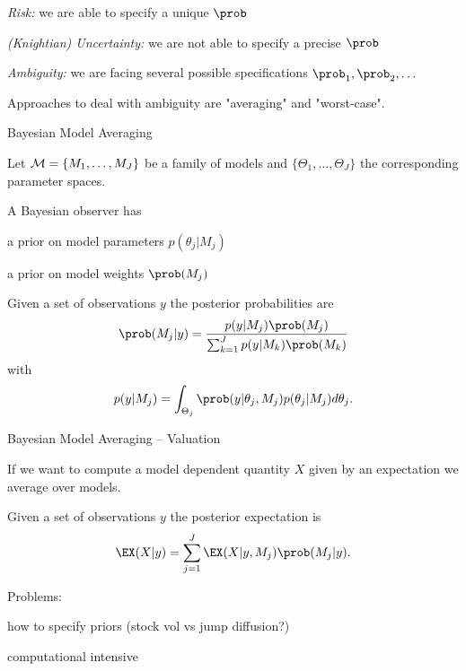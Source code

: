 



	{\it Risk:}  we are able to specify a unique $\prob$


	{\it (Knightian) Uncertainty:} we are not able to specify a precise $\prob$


	{\it Ambiguity:}  we are facing several possible specifications $\prob_1, \prob_2, \ldots$%


	Approaches to deal with ambiguity are "averaging" and "worst-case".





{Bayesian Model Averaging}






	Let ${\cal M}= \{M_1, \dots, M_J\}$ be a family of models and  $\{\Theta_1, \dots, \Theta_J\}$ the corresponding parameter spaces.


	A Bayesian observer has






	a prior on model parameters $p(\theta_j|M_j)$


	a prior on model weights $\prob(M_j)$






	Given a set of observations $y$ the posterior probabilities are
$$
\prob(M_j|y) = \frac{p(y|M_j)\prob(M_j)}{\sum_{k=1}^{J}p(y|M_k)\prob(M_k)}
$$
with
$$
p(y|M_j)=\int_{\Theta_j} \prob(y|\theta_j, M_j)p(\theta_j|M_j) d\theta_j.
$$





{Bayesian Model Averaging -- Valuation}






	If we want to compute a model dependent quantity $X$ given by an expectation we average over models.


	Given a set of observations $y$ the posterior expectation is
$$
\EX(X|y) = \sum_{j=1}^{J} \EX(X |y, M_j) \prob(M_j |y).
$$


	Problems:






	how to specify priors (stock vol vs jump diffusion?)


	computational intensive


